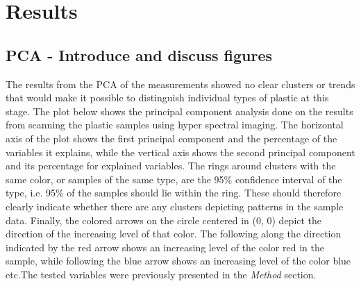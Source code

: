 \chapter{Results}
\label{chap:results}

\section{PCA - Introduce and discuss figures}
The results from the PCA of the measurements showed no clear clusters or trends that would make it possible to distinguish individual types of plastic at this stage. The plot below shows the principal component analysis done on the results from scanning the plastic samples using hyper spectral imaging. The horizontal axis of the plot shows the first principal component and the percentage of the variables it explains, while the vertical axis shows the second principal component and its percentage for explained variables. The rings around clusters with the same color, or samples of the same type, are the 95\% confidence interval of the type, i.e. 95\% of the samples should lie within the ring. These should therefore clearly indicate whether there are any clusters depicting patterns in the sample data. Finally, the colored arrows on the circle centered in (0, 0) depict the direction of the increasing level of that color. The following along the direction indicated by the red arrow shows an increasing level of the color red in the sample, while following the blue arrow shows an increasing level of the color blue etc.The tested variables were previously presented in the \textit{Method} section.

